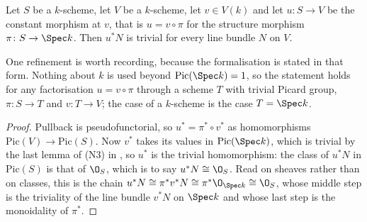 \begin{lemma}
\label{lem:cube-pullback-constant}
\leanok
Let $S$ be a $k$-scheme, let $V$ be a $k$-scheme, let $v\in V(k)$ and let
$u\colon S\to V$ be the constant morphism at $v$, that is
$u=v\circ\pi$ for the structure morphism $\pi\colon S\to\Spec k$.  Then
$u^*N$ is trivial for every line bundle $N$ on $V$.

One refinement is worth recording, because the formalisation is stated in that
form.  Nothing about $k$ is used beyond $\mathrm{Pic}(\Spec k)=1$, so the
statement holds for any factorisation $u=v\circ\pi$ through a scheme $T$ with
trivial Picard group, $\pi\colon S\to T$ and $v\colon T\to V$; the case of a
$k$-scheme is the case $T=\Spec k$.
\end{lemma}
\begin{proof}
\leanok
Pullback is pseudofunctorial, so $u^*=\pi^*\circ v^*$ as homomorphisms
$\mathrm{Pic}(V)\to\mathrm{Pic}(S)$.  Now $v^*$ takes its values in
$\mathrm{Pic}(\Spec k)$, which is trivial by the last lemma of (N3) in
, so $u^*$ is the trivial homomorphism: the class of
$u^*N$ in $\mathrm{Pic}(S)$ is that of $\O_S$, which is to say
$u^*N\cong\O_S$.  Read on sheaves rather than on classes, this is the chain
$u^*N\cong\pi^*v^*N\cong\pi^*\O_{\Spec k}\cong\O_S$, whose middle step is the
triviality of the line bundle $v^*N$ on $\Spec k$ and whose last step is the
monoidality of $\pi^*$.
\end{proof}

